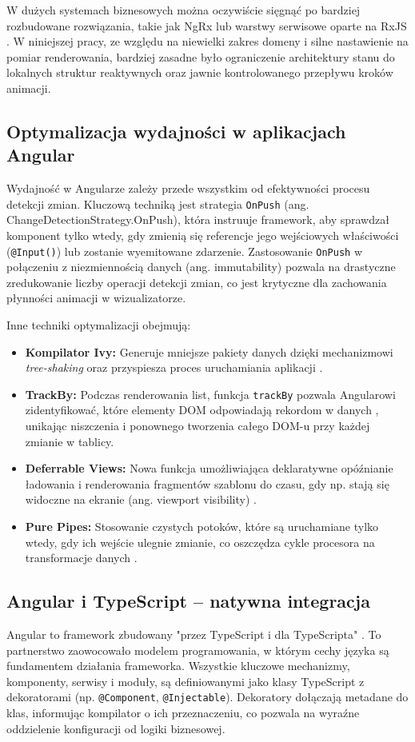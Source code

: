 \documentclass[12pt,openright,twoside]{report}
\begin{document}
W dużych systemach biznesowych można oczywiście sięgnąć po bardziej rozbudowane rozwiązania, takie jak NgRx lub warstwy serwisowe oparte na RxJS \cite{NgRx_Docs, RxJS_Action}. W niniejszej pracy, ze względu na niewielki zakres domeny i silne nastawienie na pomiar renderowania, bardziej zasadne było ograniczenie architektury stanu do lokalnych struktur reaktywnych oraz jawnie kontrolowanego przepływu kroków animacji.

\subsection{Optymalizacja wydajności w aplikacjach Angular}
Wydajność w Angularze zależy przede wszystkim od efektywności procesu detekcji zmian. Kluczową techniką jest strategia \texttt{OnPush} (ang. ChangeDetectionStrategy.OnPush), która instruuje framework, aby sprawdzał komponent tylko wtedy, gdy zmienią się referencje jego wejściowych właściwości (\texttt{@Input()}) lub zostanie wyemitowane zdarzenie. Zastosowanie \texttt{OnPush} w połączeniu z niezmiennością danych (ang. immutability) pozwala na drastyczne zredukowanie liczby operacji detekcji zmian, co jest krytyczne dla zachowania płynności animacji w wizualizatorze.

Inne techniki optymalizacji obejmują:
\begin{itemize}
    \item \textbf{Kompilator Ivy:} Generuje mniejsze pakiety danych dzięki mechanizmowi \textit{tree-shaking} oraz przyspiesza proces uruchamiania aplikacji \cite{Angular_Ivy}.
    \item \textbf{TrackBy:} Podczas renderowania list, funkcja \texttt{trackBy} pozwala Angularowi zidentyfikować, które elementy DOM odpowiadają rekordom w danych \cite{Angular_Docs}, unikając niszczenia i ponownego tworzenia całego DOM-u przy każdej zmianie w tablicy.
    \item \textbf{Deferrable Views:} Nowa funkcja umożliwiająca deklaratywne opóźnianie ładowania i renderowania fragmentów szablonu do czasu, gdy np. stają się widoczne na ekranie (ang. viewport visibility) \cite{Angular_Docs}.
    \item \textbf{Pure Pipes:} Stosowanie czystych potoków, które są uruchamiane tylko wtedy, gdy ich wejście ulegnie zmianie, co oszczędza cykle procesora na transformacje danych \cite{Angular_Docs}.
\end{itemize}

\subsection{Angular i TypeScript – natywna integracja}
Angular to framework zbudowany "przez TypeScript i dla TypeScripta" \cite{Angular_Development, Learning_TS}. To partnerstwo zaowocowało modelem programowania, w którym cechy języka są fundamentem działania frameworka. Wszystkie kluczowe mechanizmy, komponenty, serwisy i moduły, są definiowanymi jako klasy TypeScript z dekoratorami (np. \texttt{@Component}, \texttt{@Injectable}). Dekoratory dołączają metadane do klas, informując kompilator o ich przeznaczeniu, co pozwala na wyraźne oddzielenie konfiguracji od logiki biznesowej.
\end{document}
